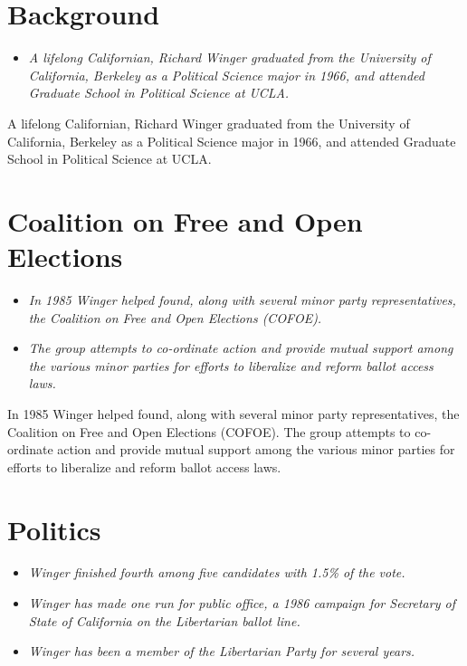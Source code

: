 \section{Background}\label{background}

\begin{itemize}
\item
  \emph{A lifelong Californian, Richard Winger graduated from the
  University of California, Berkeley as a Political Science major in
  1966, and attended Graduate School in Political Science at UCLA.}
\end{itemize}

A lifelong Californian, Richard Winger graduated from the University of
California, Berkeley as a Political Science major in 1966, and attended
Graduate School in Political Science at UCLA.

\section{Coalition on Free and Open
Elections}\label{coalition-on-free-and-open-elections}

\begin{itemize}
\item
  \emph{In 1985 Winger helped found, along with several minor party
  representatives, the Coalition on Free and Open Elections (COFOE).}
\item
  \emph{The group attempts to co-ordinate action and provide mutual
  support among the various minor parties for efforts to liberalize and
  reform ballot access laws.}
\end{itemize}

In 1985 Winger helped found, along with several minor party
representatives, the Coalition on Free and Open Elections (COFOE). The
group attempts to co-ordinate action and provide mutual support among
the various minor parties for efforts to liberalize and reform ballot
access laws.

\section{Politics}\label{politics}

\begin{itemize}
\item
  \emph{Winger finished fourth among five candidates with 1.5\% of the
  vote.}
\item
  \emph{Winger has made one run for public office, a 1986 campaign for
  Secretary of State of California on the Libertarian ballot line.}
\item
  \emph{Winger has been a member of the Libertarian Party for several
  years.}
\end{itemize}


